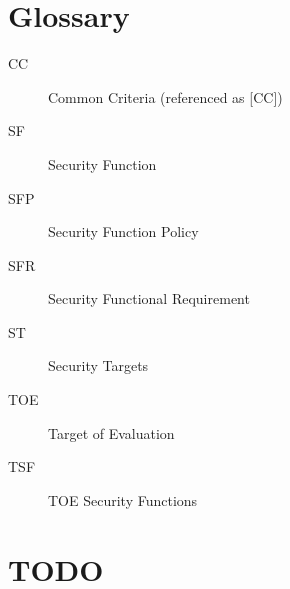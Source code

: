 \documentclass[10pt,a4paper,english]{article}
\begin{document}
\section*{Glossary}
\begin{description}
\item[CC]

Common Criteria (referenced as {[}CC])

\item[SF]

Security Function

\item[SFP]

Security Function Policy

\item[SFR]

Security Functional Requirement

\item[ST]

Security Targets

\item[TOE]

Target of Evaluation

\item[TSF]

TOE Security Functions

\end{description}



\hypertarget{todo}{}
\section*{TODO}


\end{document}
